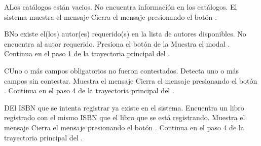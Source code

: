\begin{UCtrayectoriaA}{A}{Los catálogos están vacios.}
	\UCpaso No encuentra información en los catálogos.
    \UCpaso El sistema muestra el mensaje 
    \UCpaso[\UCactor] Cierra el mensaje presionando el botón .
\end{UCtrayectoriaA}


\begin{UCtrayectoriaA}{B}{No existe el(los) autor(es) requerido(s) en la lista de autores disponibles.}
    \UCpaso[\UCactor] No encuentra al autor requerido.
    \UCpaso[\UCactor] Presiona el botón  de la 
    \UCpaso Muestra el modal .
    \UCpaso Continua en el paso 1 de la trayectoria principal del .
\end{UCtrayectoriaA}


\begin{UCtrayectoriaA}{C}{Uno o más campos obligatorios no fueron contestados.}
	\UCpaso Detecta uno o más campos sin contestar.
    \UCpaso Muestra el mensaje 
    \UCpaso[\UCactor] Cierra el mensaje presionando el botón .
    \UCpaso Continua en el paso 4 de la trayectoria principal del .
\end{UCtrayectoriaA}


\begin{UCtrayectoriaA}{D}{El ISBN que se intenta registrar ya existe en el sistema.}
	\UCpaso Encuentra un libro registrado con el mismo ISBN que el libro que se está registrando.
    \UCpaso Muestra el mensaje 
    \UCpaso[\UCactor] Cierra el mensaje presionando el botón .
    \UCpaso Continua en el paso 4 de la trayectoria principal del .
\end{UCtrayectoriaA}